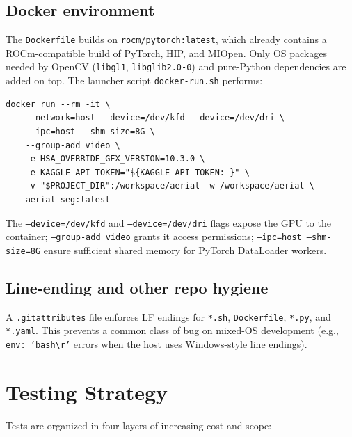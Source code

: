 \documentclass[11pt,a4paper]{article}
\begin{document}
\subsection{Docker environment}

The \texttt{Dockerfile} builds on \texttt{rocm/pytorch:latest}, which already
contains a ROCm-compatible build of PyTorch, HIP, and MIOpen. Only OS packages
needed by OpenCV (\texttt{libgl1}, \texttt{libglib2.0-0}) and pure-Python
dependencies are added on top. The launcher script \texttt{docker-run.sh} performs:

\begin{lstlisting}[style=bash, caption={Docker launch flags (excerpt).}]
docker run --rm -it \
    --network=host --device=/dev/kfd --device=/dev/dri \
    --ipc=host --shm-size=8G \
    --group-add video \
    -e HSA_OVERRIDE_GFX_VERSION=10.3.0 \
    -e KAGGLE_API_TOKEN="${KAGGLE_API_TOKEN:-}" \
    -v "$PROJECT_DIR":/workspace/aerial -w /workspace/aerial \
    aerial-seg:latest
\end{lstlisting}

The \texttt{--device=/dev/kfd} and \texttt{--device=/dev/dri} flags expose the
GPU to the container; \texttt{--group-add video} grants it access permissions;
\texttt{--ipc=host --shm-size=8G} ensure sufficient shared memory for PyTorch
DataLoader workers.

\subsection{Line-ending and other repo hygiene}

A \texttt{.gitattributes} file enforces LF endings for \texttt{*.sh},
\texttt{Dockerfile}, \texttt{*.py}, and \texttt{*.yaml}. This prevents a common
class of bug on mixed-OS development (e.g., \texttt{env: 'bash\textbackslash r'}
errors when the host uses Windows-style line endings).

\section{Testing Strategy}

Tests are organized in four layers of increasing cost and scope:
\end{document}
